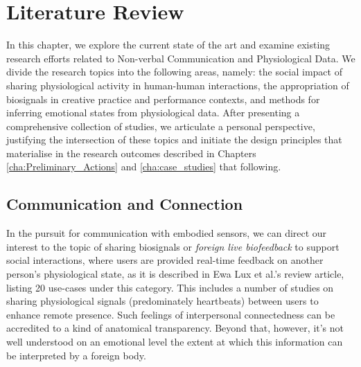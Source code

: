 

\chapter{Literature Review}
\label{cha:lit_review}

In this chapter, we explore the current state of the art and examine existing research efforts related to Non-verbal Communication and Physiological Data. We divide the research topics into the following areas, namely: the social impact of sharing physiological activity in human-human interactions, the appropriation of biosignals in creative practice and performance contexts, and methods for inferring emotional states from physiological data. After presenting a comprehensive collection of studies, we articulate a personal perspective, justifying the intersection of these topics and initiate the design principles that materialise in the research outcomes described in Chapters \ref{cha:Preliminary_Actions} and \ref{cha:case_studies} that following.

\section{Communication and Connection}
\label{lit_review:biosignals_sharing}

In the pursuit for communication with embodied sensors, we can direct our interest to the topic of sharing biosignals or \textit{foreign live biofeedback} to support social interactions, where users are provided real-time feedback on another person's physiological state, as it is described in Ewa Lux et al.'s \cite{lux_live_2018} review article, listing 20 use-cases under this category. This includes a number of studies on sharing physiological signals (predominately heartbeats) between users to enhance remote presence. Such feelings of interpersonal connectedness can be accredited to a kind of anatomical transparency. Beyond that, however, it's not well understood on an emotional level the extent at which this information can be interpreted by a foreign body.

